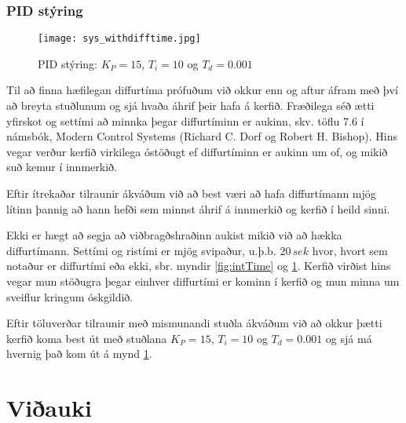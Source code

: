 \documentclass[12pt,final]{rureport}
\begin{document}
	\subsubsection{PID stýring}
	\begin{figure}[]
		\centering
		\texttt{[image: sys\_withdifftime.jpg]}
		\caption{PID stýring: $K_P = 15$, $T_i  = 10$ og $T_d = 0.001$}
		\label{fig:difftime}
	\end{figure}
	Til að finna hæfilegan diffurtíma prófuðum við okkur enn og aftur áfram með því að breyta stuðlunum og sjá hvaða áhrif þeir hafa á kerfið. Fræðilega séð ætti yfirskot og settími að minnka þegar diffurtíminn er aukinn, skv. töflu 7.6 í námsbók, Modern Control Systems (Richard C. Dorf og Robert H. Bishop). Hins vegar verður kerfið virkilega óstöðugt ef diffurtíminn er aukinn um of, og mikið suð kemur í innmerkið.
	
	Eftir ítrekaðar tilraunir ákváðum við að best væri að hafa diffurtímann mjög lítinn þannig að hann hefði sem minnst áhrif á innmerkið og kerfið í heild sinni.
	
	Ekki er hægt að segja að viðbragðshraðinn aukist mikið við að hækka diffurtímann. Settími og ristími er mjög svipaður, u.þ.b. $20\,sek$ hvor, hvort sem notaður er diffurtími eða ekki, sbr. myndir \ref{fig:intTime} og \ref{fig:difftime}. Kerfið virðist hins vegar mun stöðugra þegar einhver diffurtími er kominn í kerfið og mun minna um sveiflur kringum óskgildið.
	
	Eftir töluverðar tilraunir með mismunandi stuðla ákváðum við að okkur þætti kerfið koma best út með stuðlana $K_P = 15$, $T_i = 10$ og $T_d = 0.001$ og sjá má hvernig það kom út á mynd \ref{fig:difftime}.

	\pagebreak	

\appendix
\section{Viðauki}
	\listoffigures

\end{document}
